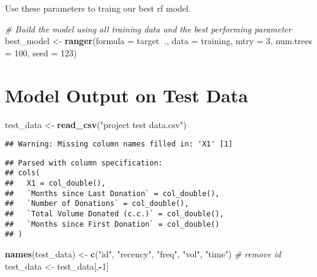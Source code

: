 \documentclass[]{article}
\newenvironment{Shaded}{\begin{snugshade}}{\end{snugshade}}
\newcommand{\KeywordTok}[1]{\textcolor[rgb]{0.13,0.29,0.53}{\textbf{#1}}}
\newcommand{\DataTypeTok}[1]{\textcolor[rgb]{0.13,0.29,0.53}{#1}}
\newcommand{\DecValTok}[1]{\textcolor[rgb]{0.00,0.00,0.81}{#1}}
\newcommand{\StringTok}[1]{\textcolor[rgb]{0.31,0.60,0.02}{#1}}
\newcommand{\CommentTok}[1]{\textcolor[rgb]{0.56,0.35,0.01}{\textit{#1}}}
\newcommand{\OperatorTok}[1]{\textcolor[rgb]{0.81,0.36,0.00}{\textbf{#1}}}
\newcommand{\NormalTok}[1]{#1}
\begin{document}
Use these parameters to traing our best rf model.

\begin{Shaded}
\begin{Highlighting}[]
\CommentTok{# Build the model using all training data and the best performing parameter}
\NormalTok{best_model <-}\StringTok{ }\KeywordTok{ranger}\NormalTok{(}\DataTypeTok{formula =}\NormalTok{ target}\OperatorTok{~}\NormalTok{., }\DataTypeTok{data =}\NormalTok{ training,}
                     \DataTypeTok{mtry =} \DecValTok{3}\NormalTok{, }\DataTypeTok{num.trees =} \DecValTok{100}\NormalTok{, }\DataTypeTok{seed =} \DecValTok{123}\NormalTok{)}
\end{Highlighting}
\end{Shaded}

\section{Model Output on Test Data}\label{model-output-on-test-data}

\begin{Shaded}
\begin{Highlighting}[]
\NormalTok{test_data <-}\StringTok{ }\KeywordTok{read_csv}\NormalTok{(}\StringTok{"project test data.csv"}\NormalTok{)}
\end{Highlighting}
\end{Shaded}

\begin{verbatim}
## Warning: Missing column names filled in: 'X1' [1]
\end{verbatim}

\begin{verbatim}
## Parsed with column specification:
## cols(
##   X1 = col_double(),
##   `Months since Last Donation` = col_double(),
##   `Number of Donations` = col_double(),
##   `Total Volume Donated (c.c.)` = col_double(),
##   `Months since First Donation` = col_double()
## )
\end{verbatim}

\begin{Shaded}
\begin{Highlighting}[]
\KeywordTok{names}\NormalTok{(test_data) <-}\StringTok{ }\KeywordTok{c}\NormalTok{(}\StringTok{"id"}\NormalTok{, }\StringTok{"recency"}\NormalTok{, }\StringTok{"freq"}\NormalTok{, }\StringTok{"vol"}\NormalTok{, }\StringTok{"time"}\NormalTok{)}
\CommentTok{# remove id}
\NormalTok{test_data <-}\StringTok{ }\NormalTok{test_data[,}\OperatorTok{-}\DecValTok{1}\NormalTok{]}
\end{Highlighting}
\end{Shaded}
\end{document}
